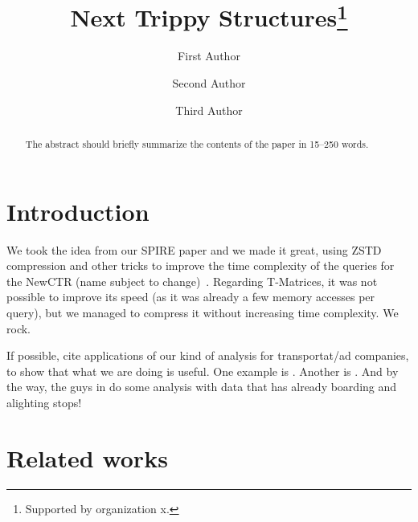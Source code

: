 \documentclass[runningheads]{llncs}
\newcommand{\acumm}{T-Matrices} %
\newcommand{\ctr}{NewCTR (name subject to change)\ }
\begin{document}
%
\title{Next Trippy Structures\thanks{Supported by organization x.}}
%
%
\author{First Author \and
Second Author \and
Third Author}
%
%
%
\maketitle              %
%
\begin{abstract}
The abstract should briefly summarize the contents of the paper in
15--250 words.

\end{abstract}
%
%
%
\section{Introduction}
We took the idea from our SPIRE paper and we made it great, using ZSTD compression and other tricks to improve the time complexity of the queries for the \ctr. Regarding \acumm, it was not possible to improve its speed (as it was already a few memory accesses per query), but we managed to compress it without increasing time complexity. We rock.

If possible, cite applications of our kind of analysis for transportat/ad companies, to show that what we are doing is useful. One example is \cite{tu2018spatial}. Another is \cite{zhang2017targeted}. And by the way, the guys in \cite{weng2018mining} do some analysis with data that has already boarding and alighting stops!

\section{Related works}
\end{document}
